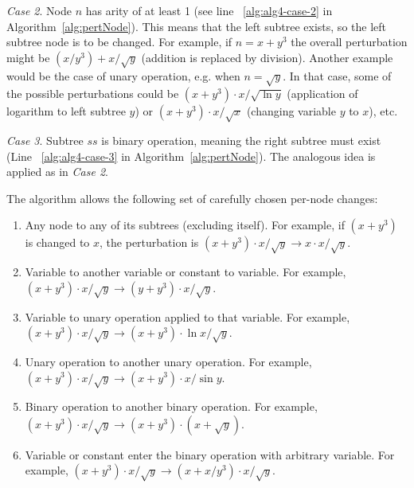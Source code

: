 \documentclass[a4paper,12pt]{elsarticle}
\begin{document}
\emph{Case 2}. 
Node $n$ has arity of at least 1 (see line ~\ref{alg:alg4-case-2} in Algorithm~\ref{alg:pertNode}). This means that the left subtree exists, so the left subtree node is to be changed. 
For example, if $n=x+y^3$ the overall perturbation might be $(x/y^3)+x/\sqrt{y}$ (addition is replaced by division). 
Another example would be the case of unary operation, e.g. when $n=\sqrt{y}$. In that case, some of the possible perturbations could be $(x+y^3)\cdot x/\sqrt{\ln{y}}$ (application of logarithm to left subtree $y$) or $(x+y^3)\cdot x/\sqrt{x}$ (changing variable $y$ to $x$), etc.

\emph{Case 3}. 
Subtree $ss$ is binary operation, meaning the right subtree must exist (Line ~\ref{alg:alg4-case-3} in Algorithm~\ref{alg:pertNode}). 
The analogous idea is applied as in \emph{Case 2}. 

The algorithm allows the following set of carefully chosen per-node changes:

\begin{enumerate}
	\item Any node to any of its subtrees (excluding itself). For example, if $(x+y^3)$ is changed to $x$, the perturbation is $(x+y^3)\cdot x/\sqrt{y} \rightarrow x\cdot x/\sqrt{y}$. 
	\item Variable to another variable or constant to variable. For example,  $(x+y^3)\cdot x/\sqrt{y} \rightarrow (y+y^3)\cdot x/\sqrt{y}$.
	\item Variable to unary operation applied to that variable. For example,  $(x+y^3)\cdot x/\sqrt{y} \rightarrow (x+y^3)\cdot \ln{x}/\sqrt{y}$.
	\item Unary operation to another unary operation. For example,  $(x+y^3)\cdot x/\sqrt{y} \rightarrow (x+y^3)\cdot x/\sin{y}$.
	\item Binary operation to another binary operation. For example,  $(x+y^3)\cdot x/\sqrt{y} \rightarrow (x+y^3)\cdot (x + \sqrt{y})$. 
	\item Variable or constant enter the binary operation with arbitrary variable. For example,  $(x+y^3)\cdot x/\sqrt{y} \rightarrow (x+x/y^3)\cdot x/\sqrt{y}$. 
\end{enumerate} 


\end{document}
